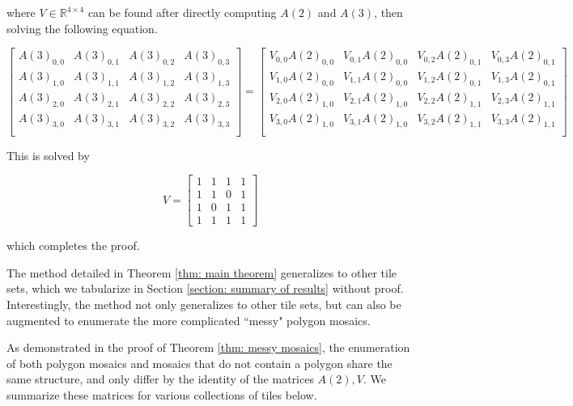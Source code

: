 \documentclass[12pt]{article}
\theoremstyle{plain}
\theoremstyle{definition}
\theoremstyle{remark}
\theoremstyle{definition}
\begin{document}
where $V \in \mathbb{R}^{4 \times 4}$ can be found after directly computing $A(2)$ and $A(3)$, then solving the following equation.

$$
\begin{bmatrix}
    A(3)_{0,0} & A(3)_{0,1} & A(3)_{0,2} & A(3)_{0,3} \\
    A(3)_{1,0} & A(3)_{1,1} & A(3)_{1,2} & A(3)_{1,3} \\
    A(3)_{2,0} & A(3)_{2,1} & A(3)_{2,2} & A(3)_{2,3} \\
    A(3)_{3,0} & A(3)_{3,1} & A(3)_{3,2} & A(3)_{3,3} \\
\end{bmatrix} = 
\begin{bmatrix}
    V_{0,0}A(2)_{0,0} & V_{0,1}A(2)_{0,0} & V_{0,2}A(2)_{0,1} & V_{0,3}A(2)_{0,1} \\
    V_{1,0}A(2)_{0,0} & V_{1,1}A(2)_{0,0} & V_{1,2}A(2)_{0,1} & V_{1,3}A(2)_{0,1} \\
    V_{2,0}A(2)_{1,0} & V_{2,1}A(2)_{1,0} & V_{2,2}A(2)_{1,1} & V_{2,3}A(2)_{1,1} \\
    V_{3,0}A(2)_{1,0} & V_{3,1}A(2)_{1,0} & V_{3,2}A(2)_{1,1} & V_{3,3}A(2)_{1,1} \\
\end{bmatrix}
$$

This is solved by

$$V = 
\begin{bmatrix} 
    1 & 1 & 1 & 1 \\ 
    1 & 1 & 0 & 1 \\ 
    1 & 0 & 1 & 1 \\ 
    1 & 1 & 1 & 1 
\end{bmatrix}
$$


which completes the proof.


The method detailed in Theorem \ref{thm: main theorem} generalizes to other tile sets, which we tabularize in Section \ref{section: summary of results} without proof. Interestingly, the method not only generalizes to other tile sets, but can also be augmented to enumerate the more complicated ``messy" polygon mosaics.



As demonstrated in the proof of Theorem \ref{thm: messy mosaics}, the enumeration of both polygon mosaics and mosaics that do not contain a polygon share the same structure, and only differ by the identity of the matrices $A(2), V$. We summarize these matrices for various collections of tiles below.
\end{document}
